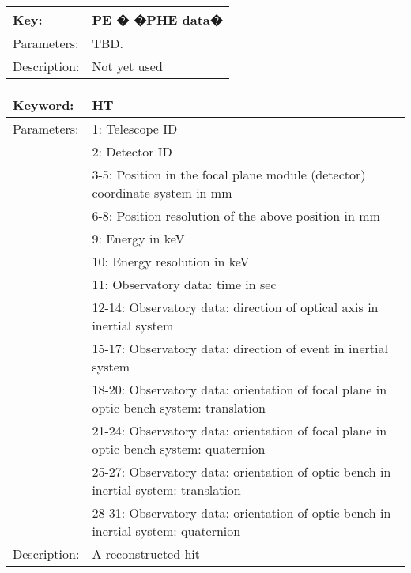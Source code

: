 \begin{table}[htdp]
\begin{center}
\begin{tabular}{|p{2cm}|p{12cm}|}
\hline
Key:&	PE � �PHE data�\\
\hline
Parameters:&	TBD.\\
\hline
Description:&	Not yet used\\
\hline
\end{tabular}
\end{center}
\end{table}

\begin{table}[htdp]
\begin{center}
\begin{tabular}{|p{2cm}|p{12cm}|}
\hline
Keyword:&	HT\\
\hline
Parameters:&	1: Telescope ID\\
&2: Detector ID\\
&3-5: Position in the focal plane module (detector) coordinate system in mm\\
&6-8: Position resolution of the above position in mm\\
&9: Energy in keV\\
&10: Energy resolution in keV\\
&11: Observatory data: time in sec\\
&12-14: Observatory data: direction of optical axis in inertial system\\
&15-17: Observatory data: direction of event in inertial system\\
&18-20: Observatory data: orientation of focal plane in optic bench system: translation\\
&21-24: Observatory data: orientation of focal plane in optic bench system: quaternion\\
&25-27: Observatory data: orientation of optic bench in inertial system: translation\\
&28-31: Observatory data: orientation of optic bench in inertial system: quaternion\\
\hline
Description:&	A reconstructed hit\\
\hline
\end{tabular}
\end{center}
\end{table}

